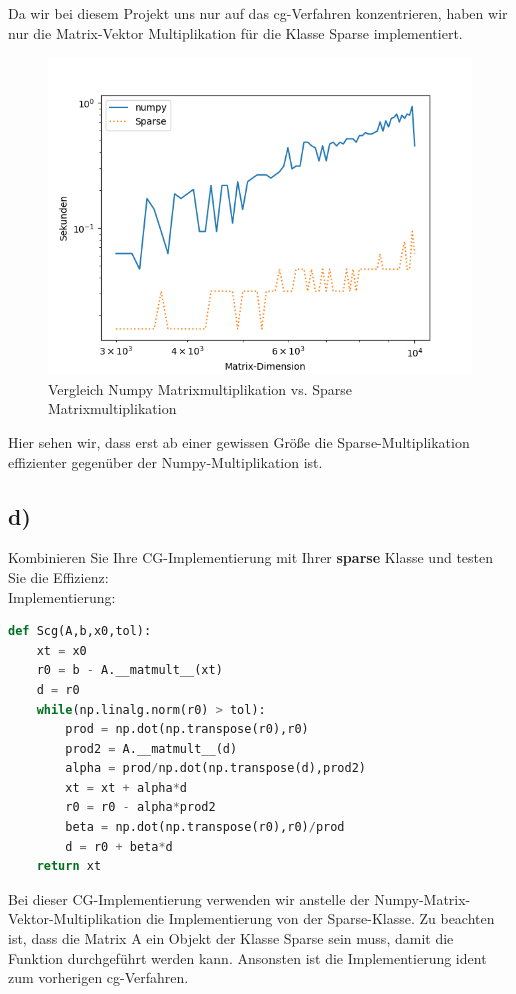 Da wir bei diesem Projekt uns nur auf das cg-Verfahren konzentrieren, haben wir nur die Matrix-Vektor Multiplikation für die Klasse Sparse implementiert.

\begin{figure}
    \centering
    \includegraphics[width=\linewidth]{Aufgabe_1/matmult_plot.png}
    \caption{Vergleich Numpy Matrixmultiplikation vs. Sparse Matrixmultiplikation}
    \label{fig:my_label}
\end{figure}
\FloatBarrier

Hier sehen wir, dass erst ab einer gewissen Größe die Sparse-Multiplikation effizienter gegenüber der Numpy-Multiplikation ist.

\subsection*{d)}
Kombinieren Sie Ihre CG-Implementierung mit Ihrer \textbf{sparse} Klasse und testen Sie die Effizienz: \\
Implementierung:
\begin{lstlisting}[language=Python]
def Scg(A,b,x0,tol):
    xt = x0
    r0 = b - A.__matmult__(xt)
    d = r0
    while(np.linalg.norm(r0) > tol):
        prod = np.dot(np.transpose(r0),r0)
        prod2 = A.__matmult__(d)
        alpha = prod/np.dot(np.transpose(d),prod2)
        xt = xt + alpha*d
        r0 = r0 - alpha*prod2
        beta = np.dot(np.transpose(r0),r0)/prod
        d = r0 + beta*d
    return xt
\end{lstlisting}

Bei dieser CG-Implementierung verwenden wir anstelle der Numpy-Matrix-Vektor-Multiplikation die Implementierung von der Sparse-Klasse.
Zu beachten ist, dass die Matrix A ein Objekt der Klasse Sparse sein muss, damit die Funktion durchgeführt werden kann.
Ansonsten ist die Implementierung ident zum vorherigen cg-Verfahren.

